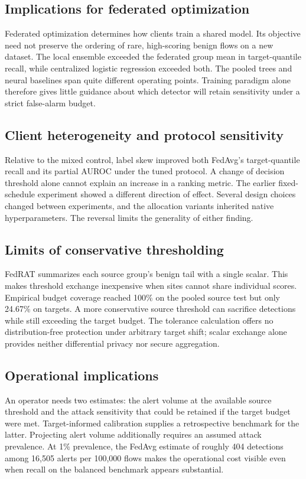 \documentclass[journal,10pt]{IEEEtran}
\begin{document}
\subsection{Implications for federated optimization}
Federated optimization determines how clients train a shared model. Its objective need not preserve the ordering of rare, high-scoring benign flows on a new dataset. The local ensemble exceeded the federated group mean in target-quantile recall, while centralized logistic regression exceeded both. The pooled trees and neural baselines span quite different operating points. Training paradigm alone therefore gives little guidance about which detector will retain sensitivity under a strict false-alarm budget.

\subsection{Client heterogeneity and protocol sensitivity}
Relative to the mixed control, label skew improved both FedAvg's target-quantile recall and its partial AUROC under the tuned protocol. A change of decision threshold alone cannot explain an increase in a ranking metric. The earlier fixed-schedule experiment showed a different direction of effect. Several design choices changed between experiments, and the allocation variants inherited native hyperparameters. The reversal limits the generality of either finding.

\subsection{Limits of conservative thresholding}
FedRAT summarizes each source group's benign tail with a single scalar. This makes threshold exchange inexpensive when sites cannot share individual scores. Empirical budget coverage reached 100\% on the pooled source test but only 24.67\% on targets. A more conservative source threshold can sacrifice detections while still exceeding the target budget. The tolerance calculation offers no distribution-free protection under arbitrary target shift; scalar exchange alone provides neither differential privacy nor secure aggregation.

\subsection{Operational implications}
An operator needs two estimates: the alert volume at the available source threshold and the attack sensitivity that could be retained if the target budget were met. Target-informed calibration supplies a retrospective benchmark for the latter. Projecting alert volume additionally requires an assumed attack prevalence. At 1\% prevalence, the FedAvg estimate of roughly 404 detections among 16,505 alerts per 100,000 flows makes the operational cost visible even when recall on the balanced benchmark appears substantial.
\end{document}
